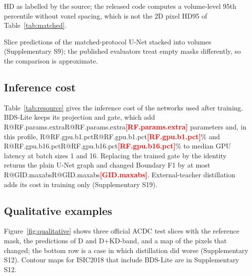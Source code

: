\documentclass[fleqn,10pt,lineno]{wlpeerj}
\makeatletter
\newcommand{\R}[1]{\ifcsname R@#1\endcsname\csname R@#1\endcsname\else\textbf{\textcolor{red}{[#1]}}\fi}
\makeatother
\begin{document}
\begin{table}[!tb]
\centering
\begin{threeparttable}
{\small}
\begin{tablenotes}[flushleft]\footnotesize
\item[a] HD as labelled by the source; the released code computes a volume-level 95th percentile without voxel spacing, which is not the 2D pixel HD95 of Table~\ref{tab:matched}.
\item[b] Slice predictions of the matched-protocol U-Net stacked into volumes (Supplementary S9); the published evaluators treat empty masks differently, so the comparison is approximate.
\end{tablenotes}
\caption{\label{tab:published}Published results under their own protocols, and volume-level scores of the plain U-Net of this study (DSC on a 0--1 scale; dashes: not reported or not listed).}
\end{threeparttable}
\end{table}

\subsection*{Inference cost}
Table~\ref{tab:resource} gives the inference cost of the networks used after training. BDS-Lite keeps its projection and gate, which add \R{RF.params.extra} parameters and, in this profile, \R{RF.gpu.b1.pct}\% and \R{RF.gpu.b16.pct}\% to median GPU latency at batch sizes 1 and 16. Replacing the trained gate by the identity returns the plain U-Net graph and changed Boundary F1 by at most \R{GID.maxabs}. External-teacher distillation adds its cost in training only (Supplementary S19).

\begin{table}[!tb]
\centering
{\small}
\caption{\label{tab:resource}Inference cost for ISIC2018 input (3 channels, 2 classes, $224\times224$): parameters and forward-pass GFLOPs of the inference graph, and median latency in FP32 on the RTX 5060 Laptop GPU at batch sizes 1 (b1) and 16 (b16) and on one CPU thread. Percentages in the text are computed from unrounded medians. Full profile: Supplementary S19.}
\end{table}

\subsection*{Qualitative examples}
Figure~\ref{fig:qualitative} shows three official ACDC test slices with the reference mask, the predictions of D and D+KD-band, and a map of the pixels that changed; the bottom row is a case in which distillation did worse (Supplementary S12). Contour maps for ISIC2018 that include BDS-Lite are in Supplementary S12.
\end{document}
